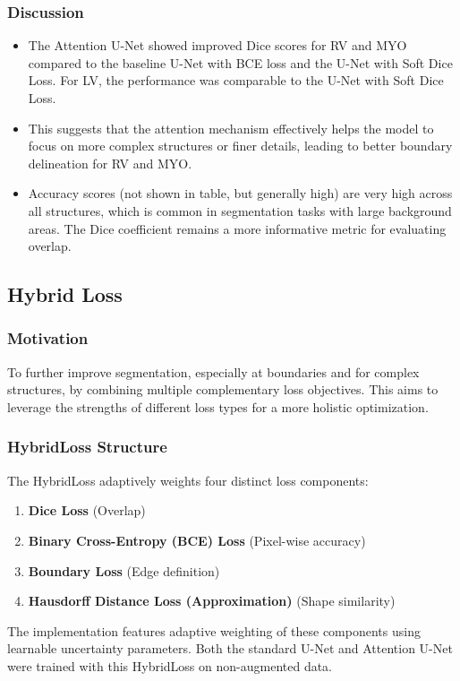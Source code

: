 \documentclass{article}
\begin{document}
\subsubsection{Discussion}
\begin{itemize}
  \item The Attention U-Net showed improved Dice scores for RV and MYO compared to the baseline U-Net with BCE loss and the U-Net with Soft Dice Loss. For LV, the performance was comparable to the U-Net with Soft Dice Loss.
  \item This suggests that the attention mechanism effectively helps the model to focus on more complex structures or finer details, leading to better boundary delineation for RV and MYO.
  \item Accuracy scores (not shown in table, but generally high) are very high across all structures, which is common in segmentation tasks with large background areas. The Dice coefficient remains a more informative metric for evaluating overlap.
\end{itemize}

\subsection{Hybrid Loss}
\subsubsection{Motivation}
To further improve segmentation, especially at boundaries and for complex structures, by combining multiple complementary loss objectives. This aims to leverage the strengths of different loss types for a more holistic optimization.

\subsubsection{HybridLoss Structure}
The HybridLoss adaptively weights four distinct loss components:
\begin{enumerate}
  \item \textbf{Dice Loss} (Overlap)
  \item \textbf{Binary Cross-Entropy (BCE) Loss} (Pixel-wise accuracy)
  \item \textbf{Boundary Loss} (Edge definition)
  \item \textbf{Hausdorff Distance Loss (Approximation)} (Shape similarity)
\end{enumerate}

The implementation features adaptive weighting of these components using learnable uncertainty parameters. Both the standard U-Net and Attention U-Net were trained with this HybridLoss on non-augmented data.
\end{document}

